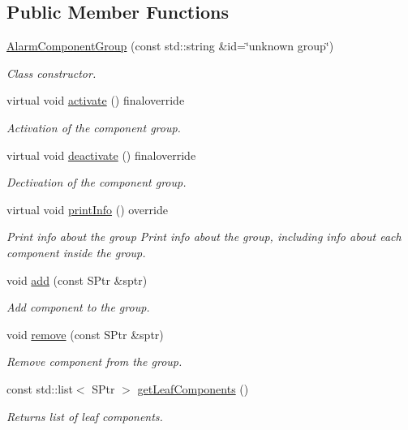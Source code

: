 \subsection*{Public Member Functions}
\begin{DoxyCompactItemize}
\item 
\hyperlink{classAlarmComponentGroup_a8cb077a6ceade9074b215919a8293b29}{Alarm\+Component\+Group} (const std\+::string \&id=\char`\"{}unknown group\char`\"{})
\begin{DoxyCompactList}\small\item\em Class constructor. \end{DoxyCompactList}\item 
virtual void \hyperlink{classAlarmComponentGroup_ac67076993e9068dc15e8d39af29698a4}{activate} () finaloverride
\begin{DoxyCompactList}\small\item\em Activation of the component group. \end{DoxyCompactList}\item 
virtual void \hyperlink{classAlarmComponentGroup_a673cebdc7e32c522af0e7435786ea118}{deactivate} () finaloverride
\begin{DoxyCompactList}\small\item\em Dectivation of the component group. \end{DoxyCompactList}\item 
virtual void \hyperlink{classAlarmComponentGroup_a07b07cb3f5b41360e3aaf83b9d0938b1}{print\+Info} () override\hypertarget{classAlarmComponentGroup_a07b07cb3f5b41360e3aaf83b9d0938b1}{}\label{classAlarmComponentGroup_a07b07cb3f5b41360e3aaf83b9d0938b1}

\begin{DoxyCompactList}\small\item\em Print info about the group Print info about the group, including info about each component inside the group. \end{DoxyCompactList}\item 
void \hyperlink{classAlarmComponentGroup_a8e6775dd15144e3a09396cfd5592779c}{add} (const S\+Ptr \&sptr)
\begin{DoxyCompactList}\small\item\em Add component to the group. \end{DoxyCompactList}\item 
void \hyperlink{classAlarmComponentGroup_a39378037a74da6477fb01f2965fe67da}{remove} (const S\+Ptr \&sptr)
\begin{DoxyCompactList}\small\item\em Remove component from the group. \end{DoxyCompactList}\item 
const std\+::list$<$ S\+Ptr $>$ \hyperlink{classAlarmComponentGroup_a5d2444572da09104bc5d9640db533324}{get\+Leaf\+Components} ()
\begin{DoxyCompactList}\small\item\em Returns list of leaf components. \end{DoxyCompactList}\end{DoxyCompactItemize}

